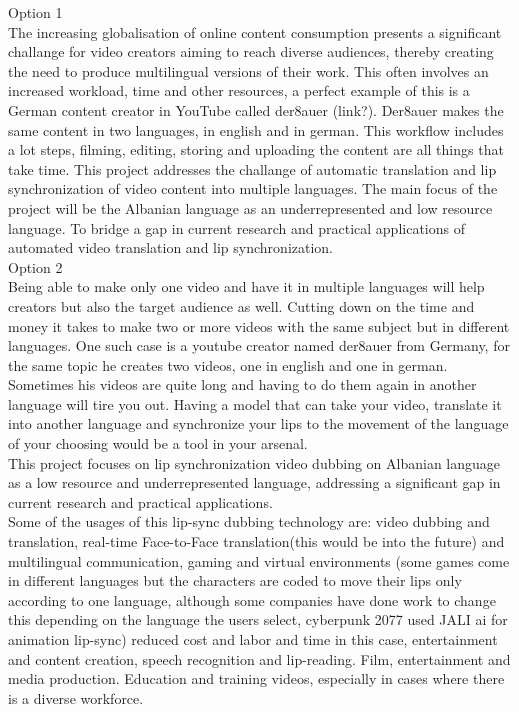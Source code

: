 \documentclass[12pt]{article}
\begin{document}
Option 1\\
The increasing globalisation of online content consumption presents a significant challange for video creators aiming to reach diverse audiences, thereby creating the need to produce multilingual versions of their work. This often involves an increased workload, time and other resources, a perfect example of this is a German content creator in YouTube called der8auer (link?). Der8auer makes the same content in two languages, in english and in german. This workflow includes a lot steps, filming, editing, storing and uploading the content are all things that take time. This project addresses the challange of automatic translation and lip synchronization of video content into multiple languages. 
The main focus of the project will be the Albanian language as an underrepresented and low resource language. To bridge a gap in current research and practical applications of automated video translation and lip synchronization.\\
Option 2\\
Being able to make only one video and have it in multiple languages will help creators but also the target audience as well. Cutting down on the time and money it takes to make two or more videos with the same subject but in different languages. One such case is a youtube creator named der8auer from Germany, for the same topic he creates two videos, one in english and one in german. Sometimes his videos are quite long and having to do them again in another language will tire you out. Having a model that can take your video, translate it into another language and synchronize your lips to the movement of the language of your choosing would be a tool in your arsenal.\\
This project focuses on lip synchronization video dubbing on Albanian language as a low resource and underrepresented language, addressing a significant gap in current research and practical applications.\\
Some of the usages of this lip-sync dubbing technology are: video dubbing and translation, real-time Face-to-Face translation(this would be into the future) and multilingual communication, gaming and virtual environments (some games come in different languages but the characters are coded to move their lips only according to one language, although some companies have done work to change this depending on the language the users select, cyberpunk 2077 used JALI ai for animation lip-sync) reduced cost and labor and time in this case, entertainment and content creation, speech recognition and lip-reading. Film, entertainment and media production. Education and training videos, especially in cases where there is a diverse workforce.\\
\end{document}
